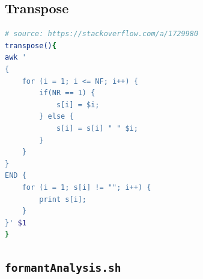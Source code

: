 \documentclass{book}
\begin{document}


\subsection{Transpose}
\label{trans}
\begin{lstlisting}[language=bash]
# source: https://stackoverflow.com/a/1729980
transpose(){
awk '
{
    for (i = 1; i <= NF; i++) {
        if(NR == 1) {
            s[i] = $i;
        } else {
            s[i] = s[i] " " $i;
        }
    }
}
END {
    for (i = 1; s[i] != ""; i++) {
        print s[i];
    }
}' $1
}
\end{lstlisting}


\subsection{\texttt{formantAnalysis.sh}}
\label{fab}
\end{document}
